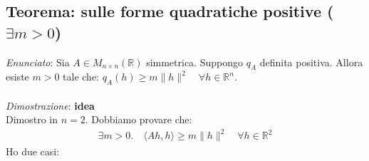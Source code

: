 \documentclass{article}
\begin{document}
\subsection{Teorema: sulle forme quadratiche positive ($\exists m > 0$)}

\emph{Enunciato}: Sia $A \in M_{n \times n} (\mathbb{R})$ simmetrica. Suppongo $q_A$ definita positiva.
Allora esiste $m > 0$ tale che: $q_A(h) \geq m \|h\|^2 \quad \forall h \in \mathbb{R}^n$. \\ \\

\noindent \emph{Dimostrazione}: \textbf{idea} \\
Dimostro in $n=2$. Dobbiamo provare che:
\begin{align*}
  \exists m > 0. \quad \langle A h, h \rangle \geq m \|h\|^2 \quad \forall h \in \mathbb{R}^2
\end{align*}
Ho due casi:
\end{document}
